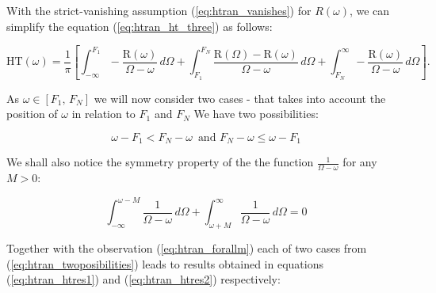 \documentclass[12pt,twoside,a4paper]{article}
\numberwithin{equation}{subsection}
\numberwithin{figure}{subsection}
\begin{document}
With the strict-vanishing assumption (\ref{eq:htran_vanishes}) for $R(\omega)$, we can simplify the equation (\ref{eq:htran_ht_three}) as follows:

\begin{equation} \label{eq:htran_ht}
  \mathrm{HT}(\omega ) = \frac{1}{\pi } \left[ 
    \int_{ -\infty }^{F_1} - \frac {\mathrm{R}(\omega )}{\Omega - \omega }\,d\Omega
  + \int_{ F_1 }^{ F_N }     \frac {\mathrm{R}(\Omega ) - \mathrm{R}(\omega )}{\Omega - \omega }\,d\Omega 
  + \int_{ F_N }^{ \infty} - \frac {\mathrm{R}(\omega )}{\Omega - \omega }\,d\Omega 
  \right] .
\end{equation}

As $\omega  \in [F_1, \,F_N]$  we will now consider two cases - that takes into account the position of  $\omega $ in relation to $F_1$  and $F_N$ We have two possibilities:

\begin{equation}   \label{eq:htran_twoposibilities}
	\omega - F_1 < F_N - \omega \, \text{ and } F_N - \omega \leq \omega - F_1 
\end{equation}

We shall also notice the symmetry property of the the function $\frac {1}{\Omega - \omega }$ for any $M > 0$:

\begin{equation} \label{eq:htran_forallm}
    \int_{ -\infty}^{\omega - M}\frac {1}{\Omega - \omega}\,d\Omega 
  + \int_{\omega + M}^{ \infty }\frac {1}{\Omega - \omega}\,d\Omega = 0
\end{equation}

Together with the observation (\ref{eq:htran_forallm}) each of two cases from (\ref{eq:htran_twoposibilities}) leads to results obtained in equations (\ref{eq:htran_htres1}) and (\ref{eq:htran_htres2}) respectively:
\end{document}
